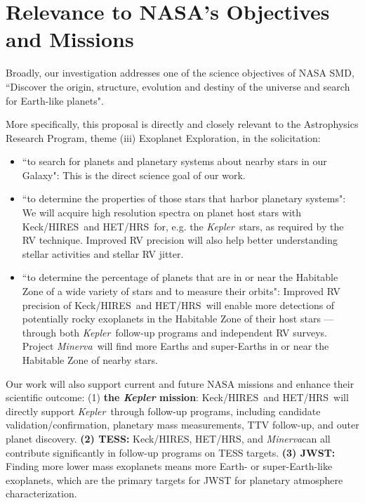 \documentclass[12pt]{article}
\def\kepler{{\it Kepler}}
\def\minerva{{\it Minerva}}
\def\hrs{HET/HRS}
\def\keck{Keck/HIRES}
\begin{document}
 
\vspace{-3pt}
\section{Relevance to NASA's Objectives and Missions}

Broadly, our investigation addresses one of the science
objectives of NASA SMD, ``Discover the origin, structure, evolution
and destiny of the universe and search for Earth-like planets".

More specifically, this proposal is directly and closely relevant to
the Astrophysics Research Program, theme (iii) Exoplanet Exploration,
in the solicitation:
\begin{itemize}[leftmargin=1.5em]
  \vspace{-3pt}
\item ``to search for planets and planetary systems about
  nearby stars in our Galaxy": This is the direct science goal of our
  work. 
  \vspace{-3pt}
\item ``to determine the properties of those stars that harbor
  planetary systems": We will acquire high resolution spectra on
  planet host stars with \keck\ and \hrs\ for, e.g. the
  \kepler\ stars, as required by the RV technique. Improved RV
  precision will also help better understanding stellar activities and
  stellar RV jitter.
  \vspace{-3pt}
\item ``to determine the percentage of planets that are in or near the
  Habitable Zone of a wide variety of stars and to measure their
  orbits": Improved RV precision of \keck\ and \hrs\ will enable more
  detections of potentially rocky exoplanets in the Habitable Zone of
  their host stars --- through both \kepler\ follow-up programs and
  independent RV surveys. Project \minerva\ will find more Earths and
  super-Earths in or near the Habitable Zone of nearby stars.
  \vspace{-3pt}
\end{itemize}

Our work will also support current and future NASA missions and
enhance their scientific outcome: (1) {\bf the \textit{Kepler}
  mission}: \keck\ and \hrs\ will directly support \kepler\ through
follow-up programs, including candidate validation/confirmation,
planetary mass measurements, TTV follow-up, and outer planet
discovery. {\bf (2) TESS:} \keck, \hrs, and \minerva can all
contribute significantly in follow-up programs on TESS targets. {\bf
  (3) JWST:} Finding more lower mass exoplanets means more Earth- or
super-Earth-like exoplanets, which are the primary targets for JWST
for planetary atmosphere characterization.
\end{document}
